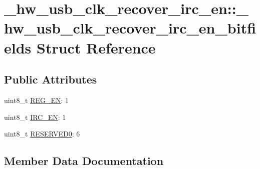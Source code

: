 \hypertarget{struct__hw__usb__clk__recover__irc__en_1_1__hw__usb__clk__recover__irc__en__bitfields}{}\section{\+\_\+hw\+\_\+usb\+\_\+clk\+\_\+recover\+\_\+irc\+\_\+en\+:\+:\+\_\+hw\+\_\+usb\+\_\+clk\+\_\+recover\+\_\+irc\+\_\+en\+\_\+bitfields Struct Reference}
\label{struct__hw__usb__clk__recover__irc__en_1_1__hw__usb__clk__recover__irc__en__bitfields}
\subsection*{Public Attributes}
\begin{DoxyCompactItemize}
\item 
uint8\+\_\+t \hyperlink{struct__hw__usb__clk__recover__irc__en_1_1__hw__usb__clk__recover__irc__en__bitfields_aec830f7594ae299e15e496a2e1282c4d}{R\+E\+G\+\_\+\+EN}\+: 1
\item 
uint8\+\_\+t \hyperlink{struct__hw__usb__clk__recover__irc__en_1_1__hw__usb__clk__recover__irc__en__bitfields_a6b1523f512be362c572cff6cae4064a0}{I\+R\+C\+\_\+\+EN}\+: 1
\item 
uint8\+\_\+t \hyperlink{struct__hw__usb__clk__recover__irc__en_1_1__hw__usb__clk__recover__irc__en__bitfields_a084b51143e0f34dc3eb0e898158e8cf3}{R\+E\+S\+E\+R\+V\+E\+D0}\+: 6
\end{DoxyCompactItemize}


\subsection{Member Data Documentation}

